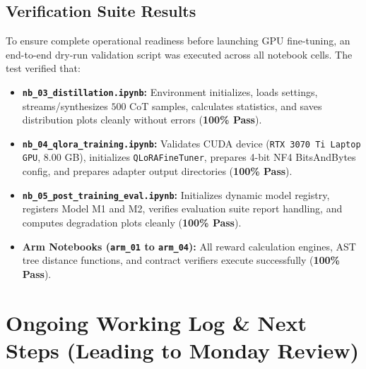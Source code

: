 \documentclass[12pt, a4paper]{article}
\begin{document}
\subsection{Verification Suite Results}
To ensure complete operational readiness before launching GPU fine-tuning, an end-to-end dry-run validation script was executed across all notebook cells. The test verified that:
\begin{itemize}[leftmargin=*]
  \item \textbf{\texttt{nb\_03\_distillation.ipynb}:} Environment initializes, loads settings, streams/synthesizes $500$ CoT samples, calculates statistics, and saves distribution plots cleanly without errors (\textbf{100\% Pass}).
  \item \textbf{\texttt{nb\_04\_qlora\_training.ipynb}:} Validates CUDA device (\texttt{RTX 3070 Ti Laptop GPU}, 8.00 GB), initializes \texttt{QLoRAFineTuner}, prepares 4-bit NF4 BitsAndBytes config, and prepares adapter output directories (\textbf{100\% Pass}).
  \item \textbf{\texttt{nb\_05\_post\_training\_eval.ipynb}:} Initializes dynamic model registry, registers Model M1 and M2, verifies evaluation suite report handling, and computes degradation plots cleanly (\textbf{100\% Pass}).
  \item \textbf{Arm Notebooks (\texttt{arm\_01} to \texttt{arm\_04}):} All reward calculation engines, AST tree distance functions, and contract verifiers execute successfully (\textbf{100\% Pass}).
\end{itemize}

\section{Ongoing Working Log \& Next Steps (Leading to Monday Review)}
\end{document}

